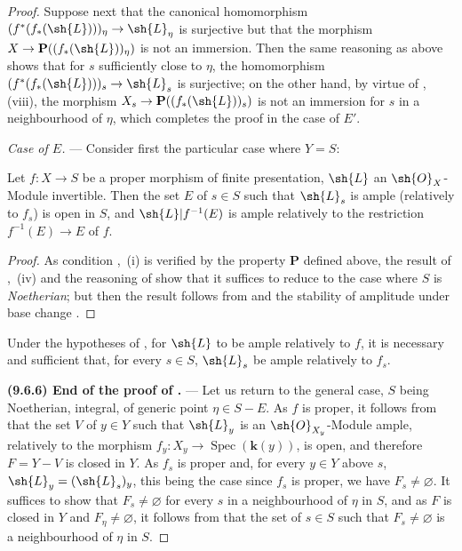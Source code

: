 \begin{proof}
Suppose next that the canonical homomorphism $(f^*(f_*(\sh{L})))_\eta\to\sh{L}_\eta$ is surjective but that the morphism $X\to\mathbf{P}((f_*(\sh{L}))_\eta)$ is not an immersion.
Then the same reasoning as above shows that for $s$ sufficiently close to $\eta$, the homomorphism $(f^*(f_*(\sh{L})))_s\to\sh{L}_s$ is surjective; on the other hand, by virtue of , (viii), the morphism $X_s\to\mathbf{P}((f_*(\sh{L}))_s)$ is not an immersion for $s$ in a neighbourhood of $\eta$, which completes the proof in the case of $E'$.

\emph{Case of $E$.} --- Consider first the particular case where $Y=S$:

\begin{corollary}[9.6.4]
\label{IV.9.6.4}
Let $f:X\to S$ be a proper morphism of finite presentation, $\sh{L}$ an $\sh{O}_X$-Module invertible.
Then the set $E$ of $s\in S$ such that $\sh{L}_s$ is ample (relatively to $f_s$) is open in $S$, and $\sh{L}|f^{-1}(E)$ is ample relatively to the restriction $f^{-1}(E)\to E$ of $f$.
\end{corollary}

\begin{proof}
As condition ,~(i) is verified by the property $\mathbf{P}$ defined above, the result of ,~(iv) and the reasoning of  show that it suffices to reduce to the case where $S$ is \emph{Noetherian}; but then the result follows from  and the stability of amplitude under base change .
\end{proof}

\begin{corollary}[9.6.5]
\label{IV.9.6.5}
Under the hypotheses of , for $\sh{L}$ to be ample relatively to $f$, it is necessary and sufficient that, for every $s\in S$, $\sh{L}_s$ be ample relatively to $f_s$.
\end{corollary}

\textbf{(9.6.6) End of the proof of .} ---
Let us return to the general case, $S$ being Noetherian, integral, of generic point $\eta\in S-E$.
As $f$ is proper, it follows from  that the set $V$ of $y\in Y$ such that $\sh{L}_y$ is an $\sh{O}_{X_y}$-Module ample, relatively to the morphism $f_y:X_y\to\operatorname{Spec}(\boldsymbol{k}(y))$, is open, and therefore $F=Y-V$ is closed in $Y$.
As $f_s$ is proper and, for every $y\in Y$ above $s$, $\sh{L}_y=(\sh{L}_s)_y$, this being the case since $f_s$ is proper, we have $F_s\neq\varnothing$.
It suffices to show that $F_s\neq\varnothing$ for every $s$ in a neighbourhood of $\eta$ in $S$, and as $F$ is closed in $Y$ and $F_\eta\neq\varnothing$, it follows from  that the set of $s\in S$ such that $F_s\neq\varnothing$ is a neighbourhood of $\eta$ in $S$.
\end{proof}

